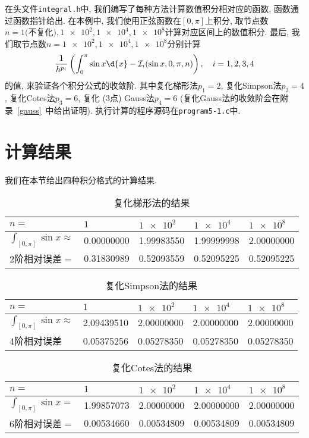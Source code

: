 \documentclass[a4paper]{ctexart}
\theoremstyle{plain}
\theoremstyle{remark}
\numberwithin{equation}{section}
\begin{document}
在头文件\verb|integral.h|中, 我们编写了每种方法计算数值积分相对应的函数, 函数通过函数指针给出.
在本例中, 我们使用正弦函数在$[0,\pi]$上积分, 取节点数$n=1\text{(不复化)},\num{1e2},\num{1e4},\num{1e8}$计算对应区间上的数值积分.
最后, 我们取节点数$n=\num{1e2},\num{1e4},\num{1e8}$分别计算
\[\frac{1}{h^{p_i}}\left(\int_0^\pi\sin{x}\d{x}-\mathcal{I}_i(\sin{x},0,\pi,n)\right),\quad i=1,2,3,4\]
的值, 来验证各个积分公式的收敛阶.
其中复化梯形法$p_1=2$, 复化Simpson法$p_2=4$, 复化Cotes法$p_3=6$, 复化 ($3$点) Gauss法$p_4=6$ (复化Gauss法的收敛阶会在附录~\ref{gauss}~中给出证明).
执行计算的程序源码在\verb|program5-1.c|中.


\section{计算结果}

我们在本节给出四种积分格式的计算结果.

\begin{table}[H]
    \centering
    \begin{tabular}{|l|l|l|l|l|}
    \hline
    $n=$ & $1$ & $\num{1e2}$ & $\num{1e4}$ & $\num{1e8}$ \\ \hline
    $\int_{[0,\pi]}\sin{x}\approx$ & 0.00000000 & 1.99983550 & 1.99999998 & 2.00000000 \\[4pt] \hline
    $2$阶相对误差$=$ & 0.31830989 & 0.52093559 & 0.52095225 & 0.52095225 \\ \hline
    \end{tabular}
    \caption{复化梯形法的结果}
\end{table}

\begin{table}[H]
    \centering
    \begin{tabular}{|l|l|l|l|l|}
    \hline
    $n=$ & $1$ & $\num{1e2}$ & $\num{1e4}$ & $\num{1e8}$ \\ \hline
    $\int_{[0,\pi]}\sin{x}\approx$ & 2.09439510 & 2.00000000 & 2.00000000 & 2.00000000 \\ \hline
    $4$阶相对误差 & 0.05375256 & 0.05278350 & 0.05278350 & 0.05278350 \\ \hline
    \end{tabular}
    \caption{复化Simpson法的结果}
\end{table}

\begin{table}[H]
    \centering
    \begin{tabular}{|l|l|l|l|l|}
    \hline
    $n=$ & $1$ & $\num{1e2}$ & $\num{1e4}$ & $\num{1e8}$ \\ \hline
    $\int_{[0,\pi]}\sin{x}=$ & 1.99857073 & 2.00000000 & 2.00000000 & 2.00000000 \\ \hline
    $6$阶相对误差$=$ & 0.00534660 & 0.00534809 & 0.00534809 & 0.00534809 \\ \hline
    \end{tabular}
    \caption{复化Cotes法的结果}
\end{table}
\end{document}
